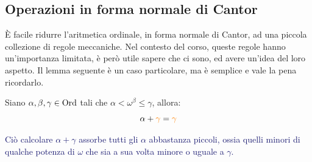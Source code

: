 \subsection{Operazioni in forma normale di Cantor}
È facile ridurre l'aritmetica ordinale, in forma normale di Cantor, ad una piccola collezione di regole meccaniche.
Nel contesto del corso, queste regole hanno un'importanza limitata, è però utile sapere che ci sono, ed avere un'idea del loro aspetto.
Il lemma seguente è un caso particolare, ma è semplice e vale la pena ricordarlo.

\begin{lemma}
	Siano $\alpha,\beta,\gamma \in \operatorname{Ord}$ tali che $\alpha < \omega^{\beta} \leq \gamma$, allora:
	\[ \alpha + \textcolor{orange}{\gamma} = \textcolor{orange}{\gamma}
		\]
\end{lemma}

\textcolor{MidnightBlue}{Ciò calcolare $\alpha + \gamma$ assorbe tutti gli $\alpha$ abbastanza piccoli, ossia quelli minori di qualche potenza di $\omega$ che sia a sua volta minore o uguale a $\gamma$.}

